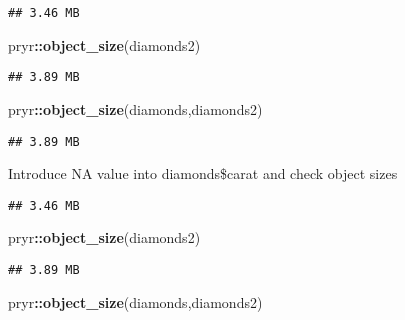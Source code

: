 \documentclass[
]{article}
\newenvironment{Shaded}{\begin{snugshade}}{\end{snugshade}}
\newcommand{\ConstantTok}[1]{\textcolor[rgb]{0.56,0.35,0.01}{#1}}
\newcommand{\DecValTok}[1]{\textcolor[rgb]{0.00,0.00,0.81}{#1}}
\newcommand{\FunctionTok}[1]{\textcolor[rgb]{0.13,0.29,0.53}{\textbf{#1}}}
\newcommand{\NormalTok}[1]{#1}
\newcommand{\OtherTok}[1]{\textcolor[rgb]{0.56,0.35,0.01}{#1}}
\newcommand{\SpecialCharTok}[1]{\textcolor[rgb]{0.81,0.36,0.00}{\textbf{#1}}}
\begin{document}
\begin{verbatim}
## 3.46 MB
\end{verbatim}

\begin{Shaded}
\begin{Highlighting}[]
\NormalTok{pryr}\SpecialCharTok{::}\FunctionTok{object\_size}\NormalTok{(diamonds2)}
\end{Highlighting}
\end{Shaded}

\begin{verbatim}
## 3.89 MB
\end{verbatim}

\begin{Shaded}
\begin{Highlighting}[]
\NormalTok{pryr}\SpecialCharTok{::}\FunctionTok{object\_size}\NormalTok{(diamonds,diamonds2)}
\end{Highlighting}
\end{Shaded}

\begin{verbatim}
## 3.89 MB
\end{verbatim}

Introduce NA value into diamonds\$carat and check object sizes

\begin{Shaded}
\end{Shaded}

\begin{verbatim}
## 3.46 MB
\end{verbatim}

\begin{Shaded}
\begin{Highlighting}[]
\NormalTok{pryr}\SpecialCharTok{::}\FunctionTok{object\_size}\NormalTok{(diamonds2)}
\end{Highlighting}
\end{Shaded}

\begin{verbatim}
## 3.89 MB
\end{verbatim}

\begin{Shaded}
\begin{Highlighting}[]
\NormalTok{pryr}\SpecialCharTok{::}\FunctionTok{object\_size}\NormalTok{(diamonds,diamonds2)}
\end{Highlighting}
\end{Shaded}
\end{document}
